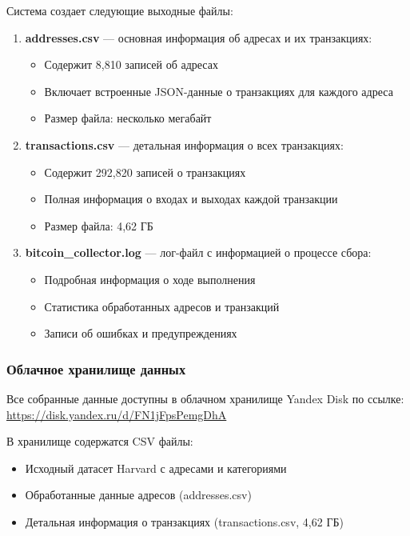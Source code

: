 Система создает следующие выходные файлы:

\begin{enumerate}
    \item \textbf{addresses.csv} --- основная информация об адресах и их транзакциях:
    \begin{itemize}
        \item Содержит 8,810 записей об адресах
        \item Включает встроенные JSON-данные о транзакциях для каждого адреса
        \item Размер файла: несколько мегабайт
    \end{itemize}
    
    \item \textbf{transactions.csv} --- детальная информация о всех транзакциях:
    \begin{itemize}
        \item Содержит 292,820 записей о транзакциях
        \item Полная информация о входах и выходах каждой транзакции
        \item Размер файла: 4,62 ГБ
    \end{itemize}
    
    \item \textbf{bitcoin\_collector.log} --- лог-файл с информацией о процессе сбора:
    \begin{itemize}
        \item Подробная информация о ходе выполнения
        \item Статистика обработанных адресов и транзакций
        \item Записи об ошибках и предупреждениях
    \end{itemize}
\end{enumerate}

\subsubsection{Облачное хранилище данных}

Все собранные данные доступны в облачном хранилище Yandex Disk по ссылке: \url{https://disk.yandex.ru/d/FN1jFpsPemgDhA}

В хранилище содержатся CSV файлы:
\begin{itemize}
    \item Исходный датасет Harvard с адресами и категориями
    \item Обработанные данные адресов (addresses.csv)
    \item Детальная информация о транзакциях (transactions.csv, 4,62 ГБ)
\end{itemize}

